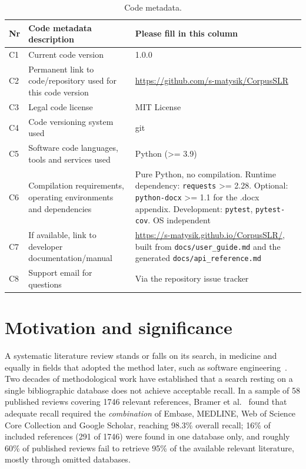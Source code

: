 \documentclass[final,5p,times,twocolumn]{elsarticle}
\begin{document}
\begin{table}[t]
\caption{Code metadata.}
\label{tab:metadata}
\small
\begin{tabular}{@{}p{}p{}p{}@{}}
\toprule
\textbf{Nr} & \textbf{Code metadata description} & \textbf{Please fill in this column} \\
\midrule
C1 & Current code version & 1.0.0 \\
C2 & Permanent link to code/repository used for this code version &
\url{https://github.com/s-matysik/CorpusSLR} \\
C3 & Legal code license & MIT License \\
C4 & Code versioning system used & git \\
C5 & Software code languages, tools and services used &
Python (>= 3.9) \\
C6 & Compilation requirements, operating environments and dependencies &
Pure Python, no compilation. Runtime dependency: \texttt{requests} >= 2.28.
Optional: \texttt{python-docx} >= 1.1 for the .docx appendix. Development:
\texttt{pytest}, \texttt{pytest-cov}. OS independent \\
C7 & If available, link to developer documentation/manual &
\url{https://s-matysik.github.io/CorpusSLR/}, built from
\texttt{docs/user\_guide.md} and the generated
\texttt{docs/api\_reference.md} \\
C8 & Support email for questions & Via the repository issue tracker \\
\bottomrule
\end{tabular}
\end{table}

\section{Motivation and significance}
\label{sec:motivation}

A systematic literature review stands or falls on its search, in medicine and
equally in fields that adopted the method later, such as software
engineering~\cite{kitchenham2009}. Two decades of
methodological work have established that a search resting on a single
bibliographic database does not achieve acceptable recall. In a sample of 58
published reviews covering 1746 relevant references, Bramer et
al.~\cite{bramer2017} found that adequate recall required the
\emph{combination} of Embase, MEDLINE, Web of Science Core Collection and
Google Scholar, reaching 98.3\% overall recall; 16\% of included references
(291 of 1746) were found in one database only, and roughly 60\% of published
reviews fail to retrieve 95\% of the available relevant literature, mostly
through omitted databases.
\end{document}
